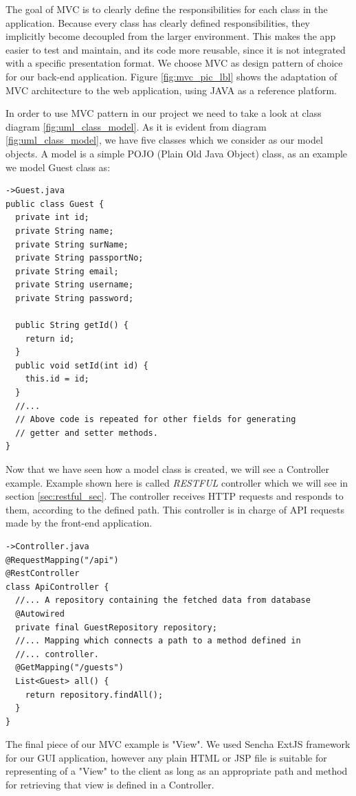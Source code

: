 The goal of MVC is to clearly define the responsibilities for each class in the application. Because every class has clearly defined responsibilities, they implicitly become decoupled from the larger environment. This makes the app easier to test and maintain, and its code more reusable, since it is not integrated with a specific presentation format. We choose MVC as design pattern of choice for our back-end application. Figure \ref{fig:mvc_pic_lbl} shows the adaptation of MVC architecture to the web application, using JAVA as a reference platform.

In order to use MVC pattern in our project we need to take a look at class diagram \ref{fig:uml_class_model}. As it is evident from diagram \ref{fig:uml_class_model}, we have five classes which we consider as our model objects.
A model is a simple POJO (Plain Old Java Object) class, as an example we model Guest class as:
\begin{verbatim}
->Guest.java
public class Guest {
  private int id;
  private String name;
  private String surName;
  private String passportNo;
  private String email;
  private String username;
  private String password;
  
  public String getId() {
    return id;
  }
  public void setId(int id) {
    this.id = id;
  }
  //... 
  // Above code is repeated for other fields for generating
  // getter and setter methods.
}
\end{verbatim}

Now that we have seen how a model class is created, we will see a Controller example. Example shown here is called \textit{RESTFUL} controller which we will see in section \ref{sec:restful_sec}. The controller receives HTTP requests  and responds to them, according to the defined path. This controller is in charge of API requests made by the front-end application. 
\label{restful_controller}
\begin{verbatim}
->Controller.java
@RequestMapping("/api")
@RestController
class ApiController {
  //... A repository containing the fetched data from database
  @Autowired
  private final GuestRepository repository;
  //... Mapping which connects a path to a method defined in 
  //... controller.
  @GetMapping("/guests")
  List<Guest> all() {
    return repository.findAll();
  }
}  
\end{verbatim}

The final piece of our MVC example is "View". We used Sencha ExtJS framework for our GUI application, however any plain HTML or JSP file is suitable for representing of a "View" to the client as long as an appropriate path and method for retrieving that view is defined in a Controller. 


